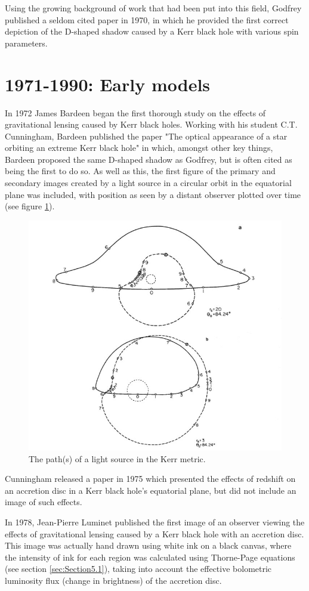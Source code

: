 \documentclass[oneside,openright,frontopenright, singlespacing]{dmathesis}
\begin{document}
\vspace{1em}
	Using the growing background of work that had been put into this field, Godfrey published a seldom cited paper in 1970, in which he provided the first correct depiction of the D-shaped shadow caused by a Kerr black hole with various spin parameters\cite{godfrey1970mach}.

\section{1971-1990: Early models}\label{sec:Section1.2}

	In 1972 James Bardeen began the first thorough study on the effects of gravitational lensing caused by Kerr black holes\cite{bardeen1973timelike}. Working with his student C.T. Cunningham, Bardeen published the paper "The optical appearance of a star orbiting an extreme Kerr black hole"\cite{cunningham1973optical} in which, amongst other key things, Bardeen proposed the same D-shaped shadow as Godfrey, but is often cited as being the first to do so. As well as this, the first figure of the primary and secondary images created by a light source in a circular orbit in the equatorial plane was included, with position as seen by a distant observer plotted over time (see figure \ref{fig:Figure1.1}).

\begin{figure}[!ht]
	\centering
	\includegraphics[width=0.4\linewidth]{img/Cunningham-Bardeen-1973-2images-2}
	\caption{The path(s) of a light source in the Kerr metric. \cite{cunningham1973optical}}
	\label{fig:Figure1.1}
\end{figure}

	Cunningham released a paper in 1975 which presented the effects of redshift on an accretion disc in a Kerr black hole's equatorial plane\cite{cunningham1975effects}, but did not include an image of such effects.

\vspace{1em}
	In 1978, Jean-Pierre Luminet published the first image of an observer viewing the effects of gravitational lensing caused by a Kerr black hole with an accretion disc\cite{luminet1979image}. This image was actually hand drawn using white ink on a black canvas, where the intensity of ink for each region was calculated using Thorne-Page equations (see section \ref{sec:Section5.1}), taking into account the effective bolometric luminosity flux (change in brightness) of the accretion disc.
\end{document}
